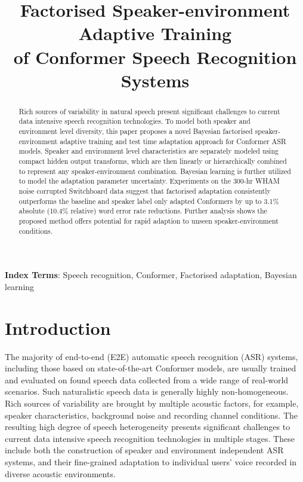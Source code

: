 \documentclass{INTERSPEECH2023}
\title{Factorised Speaker-environment Adaptive Training\\ of Conformer Speech Recognition Systems}
\begin{document}
\maketitle


\begin{abstract}
Rich sources of variability in natural speech present significant challenges to current data intensive speech recognition technologies. To model both speaker and environment level diversity, this paper proposes a novel Bayesian factorised speaker-environment adaptive training and test time adaptation approach for Conformer ASR models. Speaker and environment level characteristics are separately modeled using compact hidden output transforms, which are then linearly or hierarchically combined to represent any speaker-environment combination. Bayesian learning is further utilized to model the adaptation parameter uncertainty. Experiments on the 300-hr WHAM noise corrupted Switchboard data suggest that factorised adaptation consistently outperforms the baseline and speaker label only adapted Conformers by up to 3.1\% absolute (10.4\% relative) word error rate reductions. Further analysis shows the proposed method offers potential for rapid adaption to unseen speaker-environment conditions. 

\end{abstract}
\noindent\textbf{Index Terms}: Speech recognition, Conformer, Factorised adaptation, Bayesian learning
\section{Introduction}
The majority of end-to-end (E2E) automatic speech recognition (ASR) systems\cite{li2022recent}, including those based on state-of-the-art Conformer models\cite{guo2021recent}, are usually trained and evaluated on found speech data collected from a wide range of real-world scenarios. Such naturalistic speech data is generally highly non-homogeneous. Rich sources of variability are brought by multiple acoustic factors\cite{benzeghiba2006impact}, for example, speaker characteristics, background noise and recording channel conditions. The resulting high degree of speech heterogeneity presents significant challenges to current data intensive speech recognition technologies in multiple stages. These include both the construction of speaker and environment independent ASR systems, and their fine-grained adaptation to individual users’ voice recorded in diverse acoustic environments. 
\end{document}
